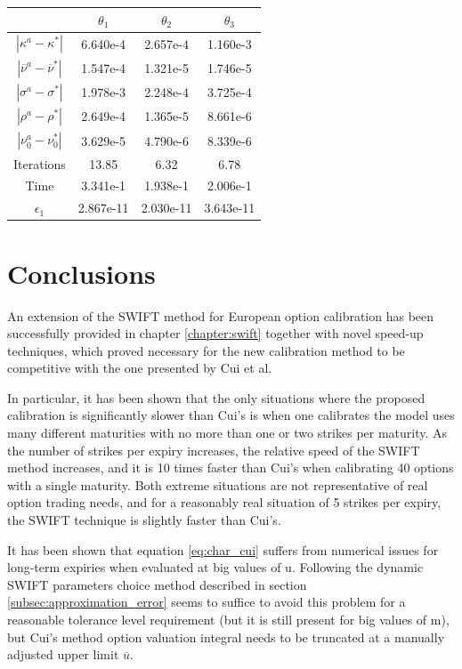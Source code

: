 \documentclass[12,twoside]{mammeTFM}
\theoremstyle{definition}
\theoremstyle{remark}
\begin{document}
\begin{center}
 \begin{tabular}{|c | c | c | c|} 
 \hline
  & $\theta_1$ & $\theta_2$ & $\theta_3$\\ [0.5ex] 
 \hline
 $|\kappa^{a} - \kappa^{*}|$ & 6.640e-4 & 2.657e-4 & 1.160e-3 \\ 
 \hline
 $|\overline{\nu}^{a} - \overline{\nu}^{*}|$ & 1.547e-4 & 1.321e-5 & 1.746e-5\\
 \hline
 $|\sigma^{a} - \sigma^{*}|$ & 1.978e-3 & 2.248e-4 & 3.725e-4 \\
 \hline
 $|\rho^{a} - \rho^{*}|$ & 2.649e-4 & 1.365e-5 & 8.661e-6  \\
 \hline
 $|\nu_0^{a} - \nu_0^{*}|$ & 3.629e-5 & 4.790e-6 & 8.339e-6  \\
 \hline
 Iterations & 13.85 & 6.32 & 6.78 \\
 \hline
 Time & 3.341e-1 & 1.938e-1 & 2.006e-1 \\
 \hline
 $\epsilon_1$ & 2.867e-11 & 2.030e-11 & 3.643e-11\\
 \hline
\end{tabular}
\end{center}

\section{Conclusions}

An extension of the SWIFT method for European option calibration has been successfully provided in chapter \ref{chapter:swift} together with novel speed-up techniques, which proved necessary for the new calibration method to be competitive with the one presented by Cui et al.

In particular, it has been shown that the only situations where the proposed calibration is significantly slower than Cui's is when one calibrates the model uses many different maturities with no more than one or two strikes per maturity. As the number of strikes per expiry increases, the relative speed of the SWIFT method increases, and it is 10 times faster than Cui's when calibrating 40 options with a single maturity. Both extreme situations are not representative of real option trading needs, and for a reasonably real situation of 5 strikes per expiry, the SWIFT technique is slightly faster than Cui's.

It has been shown that equation \ref{eq:char_cui} suffers from numerical issues for long-term expiries when evaluated at big values of u. Following the dynamic SWIFT parameters choice method described in section \ref{subsec:approximation_error} seems to suffice to avoid this problem for a reasonable tolerance level requirement (but it is still present for big values of m), but Cui's method option valuation integral needs to be truncated at a manually adjusted upper limit $\overline{u}$.
\end{document}
